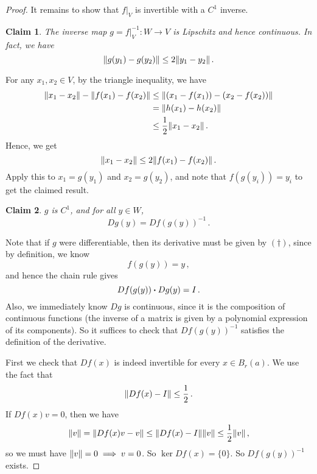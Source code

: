 \documentclass{article}
\theoremstyle{plain}\theoremheaderfont{\normalfont\itshape}\theorembodyfont{\rmfamily}\theoremseparator{.}\newtheorem*{rem}{Remark}\newtheorem*{ex}{Example}\newtheorem*{proof}{Proof}\newtheorem*{altp}{Alternative proof}
\theoremstyle{plain}\theoremheaderfont{\normalfont\bfseries}\theorembodyfont{\rmfamily}\theoremseparator{.}\newtheorem{thm}{Theorem}[section]\newtheorem{lem}[thm]{Lemma}\newtheorem{prop}[thm]{Proposition}\newtheorem*{cor}{Corollary}\newtheorem{defn}[thm]{Definition}\newtheorem{clm}[thm]{Claim}\newtheorem{clminproof}{Claim}
\theoremstyle{break}\theoremheaderfont{\normalfont\itshape}\theorembodyfont{\rmfamily}\theoremseparator{.\medskip}\newtheorem*{proofskip}{Proof}\newtheorem*{exs}{Examples}\newtheorem*{rems}{Remarks}
\theoremstyle{break}\theoremheaderfont{\normalfont\bfseries}\theorembodyfont{\rmfamily}\theoremseparator{.\medskip}\newtheorem{lemskip}[thm]{Lemma}\newtheorem{defnskip}[thm]{Definition}\newtheorem{propskip}[thm]{Proposition}\newtheorem{thmskip}[thm]{Theorem}
\begin{document}
\begin{proof}
        It remains to show that \(f|_V\) is invertible with a \(C^{1}\) inverse.

        \begin{clminproof}
            The inverse map \(g=f|_V^{-1}:W\to V\) is Lipschitz and hence continuous. In fact, we have
            \[\norm{g(y_1)-g(y_2)}\le 2\norm{y_1-y_2}\,.\]
        \end{clminproof}
        For any \(x_1,x_2\in V\), by the triangle inequality, we have
        \begin{align*}
            \norm{x_1-x_2}-\norm{f(x_1)-f(x_2)}&\le\norm{(x_1-f(x_1))-(x_2-f(x_2))}\\
            &=\norm{h(x_1)-h(x_2)}\\
            &\le\frac{1}{2}\norm{x_1-x_2}\,.
        \end{align*}
        Hence, we get
        \[\norm{x_1-x_2}\le 2\norm{f(x_1)-f(x_2)}\,.\]
        Apply this to \(x_1=g(y_1)\) and \(x_2=g(y_2)\), and note that \(f(g(y_i))=y_i\) to get the claimed result.

        \begin{clminproof}
            \(g\) is \(C^{1}\), and for all \(y\in W\),
            \begin{equation}\tag{\(\dagger\)}
                Dg(y)=Df(g(y))^{-1}\,.
            \end{equation}
        \end{clminproof}
        Note that if \(g\) were differentiable, then its derivative must be given by \((\dagger)\), since by definition, we know
        \[f(g(y))=y\,,\]
        and hence the chain rule gives
        \[Df(g(y))\vdot Dg(y)=I\,.\]
        Also, we immediately know \(Dg\) is continuous, since it is the composition of continuous functions (the inverse of a matrix is given by a polynomial expression of its components). So it suffices to check that \(Df(g(y))^{-1}\) satisfies the definition of the derivative.

        First we check that \(Df(x)\) is indeed invertible for every \(x\in B_r(a)\). We use the fact that
        \[\norm{Df(x)-I}\le\frac{1}{2}\,.\]
        If \(Df(x)v=0\), then we have
        \[\norm{v}=\norm{Df(x)v-v}\le\norm{Df(x)-I}\norm{v}\le\frac{1}{2}\norm{v}\,,\]
        so we must have \(\norm{v}=0\implies v=0\). So \(\ker Df(x)=\{0\}\). So \(Df(g(y))^{-1}\) exists.


\end{proof}
\end{document}
